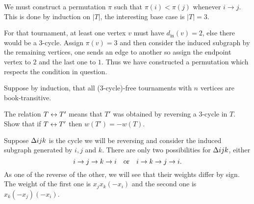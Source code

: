\documentclass[12pt]{memoir}
\begin{document}
\begin{ptcbr}
    We must construct a permutation $\pi$ such that $\pi(i)<\pi(j)$ whenever $i\to j$. This is done by induction on $|T|$, the interesting base case is $|T|=3$.\par 
    For that tournament, at least one vertex $v$ must have $d_{\text{in}}(v)=2$, else there would be a 3-cycle. Assign $\pi(v)=3$ and then consider the induced subgraph by the remaining vertices, one sends an edge to another so assign the endpoint vertex to $2$ and the last one to $1$. Thus we have constructed a permutation which respects the condition in question.\par 
    Suppose by induction, that all (3-cycle)-free tournaments with $n$ vertices are book-transitive.
\end{ptcbr}

\begin{Ej}
The relation $T\leftrightarrow T'$ means that $T'$ was obtained by reversing a 3-cycle in $T$. Show that if $T\leftrightarrow T'$ then $w(T')=-w(T)$. 
\end{Ej}

\begin{ptcbr}
    Suppose $\Delta ijk$ is the cycle we will be reversing and consider the induced subgraph generated by $i,j$ and $k$. There are only two possibilities for $\Delta ijk$, either 
    $$i\to j\to k\to i\quad\text{or}\quad i\to k\to j\to i.$$
    As one of the reverse of the other, we will see that their weights differ by sign. The weight of the first one is $x_jx_k(-x_i)$ and the second one is $x_k(-x_j)(-x_i)$. 
\end{ptcbr}
\end{document}
